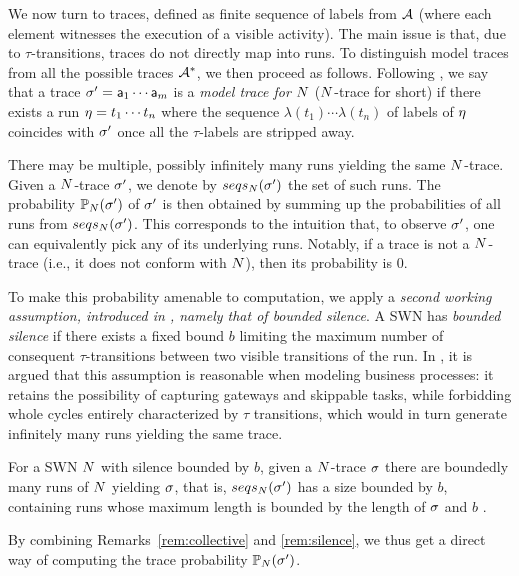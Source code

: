 We now turn to traces, defined as finite sequence of labels from $\mathcal{A}$ (where each element witnesses the execution of a visible activity). The main issue is that, due to $\tau$-transitions, traces do not directly map into runs. To distinguish model traces from all the possible traces $\mathcal{A}^*$, we then proceed as follows. Following \cite{DBLP:conf/edoc/AdriansyahDA11,LeoniM17},  we say that a trace ${\sigma'}=\mathsf{a}_1\cdots \mathsf{a}_m$ is a \emph{model trace for $N$} ($N$-trace for short) if there exists a run $\eta = t_1\cdots t_n$ where the sequence $\lambda(t_1)\cdots \lambda(t_n)$ of labels of $\eta$ coincides with ${\sigma'}$ once all the $\tau$-labels are stripped away.

There may be multiple, possibly infinitely many runs yielding the same $N$-trace. Given a $N$-trace ${\sigma'}$, we denote by $seqs_{N}({\sigma'})$ the set of such runs. The probability $\mathbb{P}_{N}({\sigma'})$ of ${\sigma'}$ is then obtained by summing up the probabilities of all runs from $seqs_{N}({\sigma'})$.
This corresponds to the intuition that, to observe ${\sigma'}$, one can equivalently pick any of its underlying runs. Notably, if a trace is not a $N$-trace (i.e., it does not conform with $N$), then its probability is 0.

To make this probability amenable to computation, we apply a \emph{second working assumption, introduced in \cite{Bergami21}, namely that of bounded silence}. A SWN has \emph{bounded silence} if there exists a fixed bound $b$ limiting the maximum number of consequent $\tau$-transitions between two visible transitions of the run. In \cite{Bergami21}, it is argued that this assumption is reasonable when modeling business processes: it retains the possibility of capturing gateways and skippable tasks, while forbidding whole cycles entirely characterized by $\tau$ transitions, which would in turn generate infinitely many runs yielding the same trace.

\begin{remark}
\label{rem:silence}
	For a SWN $N$ with silence bounded by $b$, given a $N$-trace $\sigma$ there are boundedly many runs of $N$ yielding $\sigma$, that is, $seqs_{N}({\sigma'})$ has a size bounded by $b$, containing runs whose maximum length is bounded by the length of $\sigma$ and $b$ \cite{Bergami21}.
\end{remark}

By combining Remarks~\ref{rem:collective} and \ref{rem:silence}, we thus get a direct way of computing the trace probability $\mathbb{P}_{N}({\sigma'})$.

